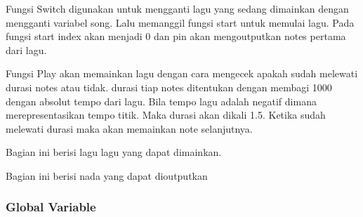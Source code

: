 \documentclass[a4paper,12pt]{article}
\begin{document}
Fungsi Switch digunakan untuk mengganti lagu yang sedang dimainkan dengan mengganti variabel song. Lalu memanggil
fungsi start untuk memulai lagu. Pada fungsi start index akan menjadi 0 dan pin akan mengoutputkan notes pertama dari lagu.

Fungsi Play akan memainkan lagu dengan cara mengecek apakah sudah melewati durasi notes atau tidak.
durasi tiap notes ditentukan dengan membagi 1000 dengan absolut tempo dari lagu. Bila tempo lagu adalah negatif dimana merepresentasikan
tempo titik. Maka durasi akan dikali 1.5. Ketika sudah melewati durasi maka akan memainkan note selanjutnya.

Bagian ini berisi lagu lagu yang dapat dimainkan.

Bagian ini berisi nada yang dapat dioutputkan

\subsubsection{Global Variable}


\end{document}
